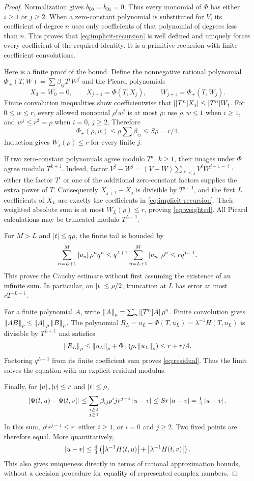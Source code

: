 \begin{proof}
Normalization gives $b_{00}=b_{01}=0$. Thus every monomial of $\Phi$
has either $i\ge1$ or $j\ge2$. When a zero-constant polynomial is
substituted for $V$, its coefficient of degree $n$ uses only coefficients
of that polynomial of degrees less than $n$. This proves that
\eqref{eq:implicit-recursion} is well defined and uniquely forces every
coefficient of the required identity. It is a primitive recursion with
finite coefficient convolutions.

Here is a finite proof of the bound. Define the nonnegative rational
polynomial $\Phi_+(T,W)=\sum\beta_{ij}T^iW^j$ and the Picard polynomials
\[
 X_0=W_0=0,\qquad X_{j+1}=\Phi(T,X_j),\qquad
 W_{j+1}=\Phi_+(T,W_j).
\]
Finite convolution inequalities show coefficientwise that
$\left|[T^n]X_j\right|\le[T^n]W_j$. For $0\le w\le r$, every allowed
monomial $\rho^iw^j$ is at most $\rho$: use $\rho,w\le1$ when
$i\ge1$, and $w^j\le r^2=\rho$ when $i=0$, $j\ge2$. Therefore
\[
 \Phi_+(\rho,w)\le\rho\sum\beta_{ij}\le S\rho=r/4.
\]
Induction gives $W_j(\rho)\le r$ for every finite $j$.

If two zero-constant polynomials agree modulo $T^k$, $k\ge1$,
their images under $\Phi$ agree modulo $T^{k+1}$. Indeed, factor
$V^j-W^j=(V-W)\sum_{\ell<j}V^\ell W^{j-1-\ell}$: either the
factor $T^i$ or one of the additional zero-constant factors supplies the
extra power of $T$. Consequently $X_{j+1}-X_j$ is divisible by
$T^{j+1}$, and the first $L$ coefficients of $X_L$ are exactly the
coefficients in \eqref{eq:implicit-recursion}. Their weighted absolute
sum is at most $W_L(\rho)\le r$, proving \eqref{eq:weighted}.
All Picard calculations may be truncated modulo $T^{L+1}$.

For $M>L$ and $\left|t\right|\le q\rho$, the finite tail is bounded by
\[
 \sum_{n=L+1}^{M}\left|u_n\right|\rho^n q^n
 \le q^{L+1}\sum_{n=L+1}^{M}\left|u_n\right|\rho^n
 \le r q^{L+1}.
\]
This proves the Cauchy estimate without first assuming the existence of
an infinite sum. In particular, on $\left|t\right|\le\rho/2$, truncation at
$L$ has error at most $r2^{-L-1}$.

For a finite polynomial $A$, write
$\left\lVert A\right\rVert_\rho=\sum_n\left|[T^n]A\right|\rho^n$.
Finite convolution gives $\left\lVert AB\right\rVert_\rho\le\left\lVert A\right\rVert_\rho\left\lVert B\right\rVert_\rho$.
The polynomial
$R_L=u_L-\Phi(T,u_L)=\lambda^{-1}H(T,u_L)$ is divisible by
$T^{L+1}$ and satisfies
\[
 \left\lVert R_L\right\rVert_\rho
 \le\left\lVert u_L\right\rVert_\rho+\Phi_+(\rho,\left\lVert u_L\right\rVert_\rho)
 \le r+r/4.
\]
Factoring $q^{L+1}$ from its finite coefficient sum proves
\eqref{eq:residual}. Thus the limit solves the equation with an explicit
residual modulus.

Finally, for $\left|u\right|,\left|v\right|\le r$ and $\left|t\right|\le\rho$,
\[
 \left|\Phi(t,u)-\Phi(t,v)\right|
 \le\sum_{\substack{i\ge0\\j\ge1}}\beta_{ij}\rho^i j r^{j-1}\left|u-v\right|
 \le Sr\left|u-v\right|=\tfrac14\left|u-v\right|.
\]
In this sum, $\rho^ir^{j-1}\le r$: either $i\ge1$, or $i=0$
and $j\ge2$. Two fixed points are therefore equal. More quantitatively,
\[
 \left|u-v\right|\le\tfrac43\left(
 \left|\lambda^{-1}H(t,u)\right|+\left|\lambda^{-1}H(t,v)\right|\right).
\]
This also gives uniqueness directly in terms of rational approximation
bounds, without a decision procedure for equality of represented complex
numbers.
\end{proof}


